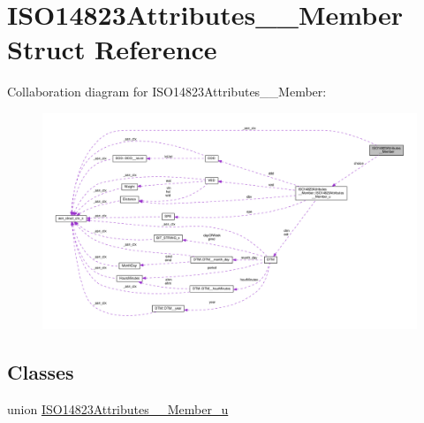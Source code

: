 \hypertarget{structISO14823Attributes____Member}{}\section{I\+S\+O14823\+Attributes\+\_\+\+\_\+\+Member Struct Reference}
\label{structISO14823Attributes____Member}


Collaboration diagram for I\+S\+O14823\+Attributes\+\_\+\+\_\+\+Member\+:\nopagebreak
\begin{figure}[H]
\begin{center}
\leavevmode
\includegraphics[width=350pt]{structISO14823Attributes____Member__coll__graph}
\end{center}
\end{figure}
\subsection*{Classes}
\begin{DoxyCompactItemize}
\item 
union \hyperlink{unionISO14823Attributes____Member_1_1ISO14823Attributes____Member__u}{I\+S\+O14823\+Attributes\+\_\+\+\_\+\+Member\+\_\+u}
\end{DoxyCompactItemize}
